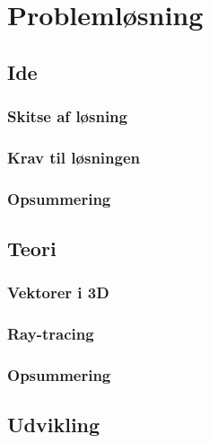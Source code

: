 \section{Problemløsning}

\subsection{Ide}

\subsubsection{Skitse af løsning}

\subsubsection{Krav til løsningen}

\subsubsection*{Opsummering}

\subsection{Teori}

\subsubsection{Vektorer i 3D}

\subsubsection{Ray-tracing}

\subsubsection*{Opsummering}

\subsection{Udvikling}


\clearpage